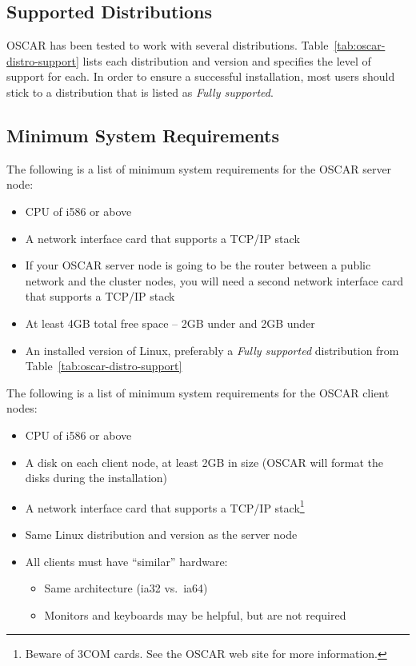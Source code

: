 \subsection{Supported Distributions}

OSCAR has been tested to work with several distributions.
Table~\ref{tab:oscar-distro-support} lists each distribution and
version and specifies the level of support for each. In order to
ensure a successful installation, most users should stick to a
distribution that is listed as \emph{Fully supported}.




\subsection{Minimum System Requirements}
\label{sec:intro-min-sys}

\begchange

The following is a list of minimum system requirements for the OSCAR
server node:

\begin{itemize}
\item CPU of i586 or above
\item A network interface card that supports a TCP/IP stack
\item If your OSCAR server node is going to be the router between a
  public network and the cluster nodes, you will need a second
  network interface card that supports a TCP/IP stack
\item At least 4GB total free space -- 2GB under \file{/} and 2GB
  under 
\item An installed version of Linux, preferably a {\em Fully
    supported} distribution from Table~\ref{tab:oscar-distro-support}
\end{itemize}

The following is a list of minimum system requirements for the OSCAR
client nodes:

\begin{itemize}
\item CPU of i586 or above
\item A disk on each client node, at least 2GB in size (OSCAR will
  format the disks during the installation)
\item A network interface card that supports a TCP/IP
  stack\footnote{Beware of 3COM cards.  See the OSCAR web site for
  more information.}
\item Same Linux distribution and version as the server node
\item All clients must have ``similar'' hardware:
  \begin{itemize}
  \item Same architecture (ia32 vs.\ ia64)
  \item Monitors and keyboards may be helpful, but are not required
  \end{itemize}
\end{itemize}

